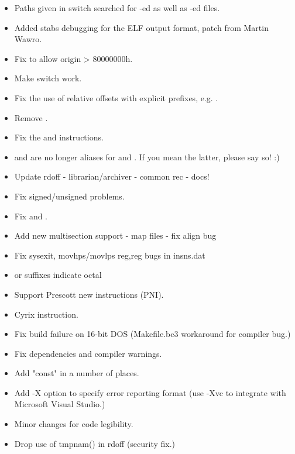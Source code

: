 \begin{itemize}
    \item{Paths given in  switch searched for -ed as
        well as -ed files.}
    \item{Added stabs debugging for the ELF output format, patch from
        Martin Wawro.}
    \item{Fix  to allow origin > 80000000h.}
    \item{Make  switch work.}
    \item{Fix the use of relative offsets with explicit prefixes, e.g. 
        .}
    \item{Remove .}
    \item{Fix the  and  instructions.}
    \item{ and  are no longer aliases for  and .
        If you mean the latter, please say so! :)}
\end{itemize}


\begin{itemize}
    \item{Update rdoff - librarian/archiver - common rec - docs!}
    \item{Fix signed/unsigned problems.}
    \item{Fix  and .}
    \item{Add new multisection support - map files - fix align bug}
    \item{Fix sysexit, movhps/movlps reg,reg bugs in insns.dat}
    \item{ or  suffixes indicate octal}
    \item{Support Prescott new instructions (PNI).}
    \item{Cyrix  instruction.}
\end{itemize}



\begin{itemize}
    \item{Fix build failure on 16-bit DOS (Makefile.bc3 workaround for compiler bug.)}
    \item{Fix dependencies and compiler warnings.}
    \item{Add "const" in a number of places.}
    \item{Add -X option to specify error reporting format (use -Xvc to
        integrate with Microsoft Visual Studio.)}
    \item{Minor changes for code legibility.}
    \item{Drop use of tmpnam() in rdoff (security fix.)}
\end{itemize}

